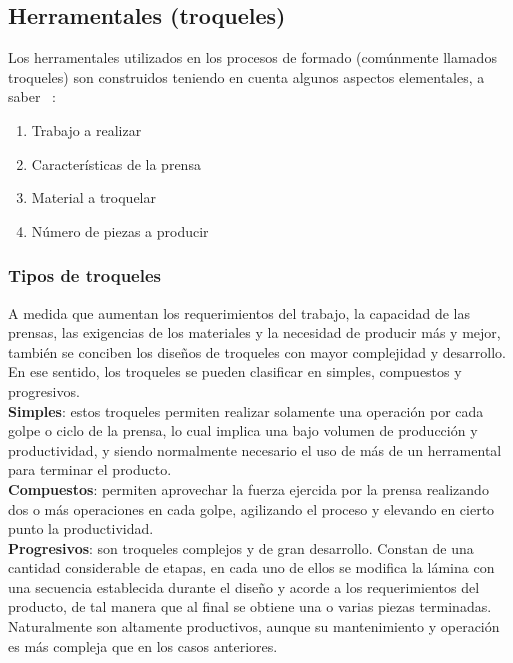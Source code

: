 \subsection{Herramentales (troqueles)}

Los herramentales utilizados en los procesos de formado (comúnmente llamados troqueles) son 
construidos teniendo en cuenta algunos aspectos elementales, a saber ~\cite{marin2009}:

\begin{enumerate}
\item Trabajo a realizar 
\item Características de la prensa
\item Material a troquelar
\item Número de piezas a producir
\end{enumerate}

\subsubsection{Tipos de troqueles}

A medida que aumentan los requerimientos del trabajo, la capacidad de las prensas, las exigencias 
de los materiales y la necesidad de producir más y mejor, también se conciben los diseños de 
troqueles con mayor complejidad y desarrollo. En ese sentido, los troqueles se pueden clasificar 
en simples, compuestos y progresivos.\\

\textbf{Simples}: estos troqueles permiten realizar solamente una operación por cada golpe o 
ciclo de la prensa, lo cual implica una bajo volumen de producción y productividad, y 
siendo normalmente necesario el uso de más de un herramental para terminar el producto.\\

\textbf{Compuestos}: permiten aprovechar la fuerza ejercida por la prensa realizando dos 
o más operaciones en cada golpe, agilizando el proceso y elevando en cierto punto 
la productividad.\\

\textbf{Progresivos}: son troqueles complejos y de gran desarrollo. Constan de una 
cantidad considerable de etapas, en cada uno de ellos se modifica la lámina con una secuencia 
establecida durante el diseño y acorde a los requerimientos del producto, de tal manera 
que al final se obtiene una o varias piezas terminadas. Naturalmente son altamente productivos, 
aunque su mantenimiento y operación es más compleja que en los casos anteriores.

